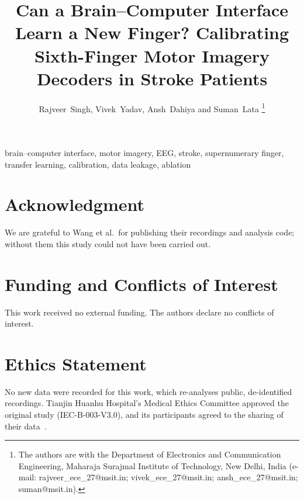 \documentclass[journal,onecolumn,11pt]{IEEEtran}
\begin{document}

\title{Can a Brain--Computer Interface Learn a New Finger? Calibrating Sixth-Finger Motor
Imagery Decoders in Stroke Patients}

\author{Rajveer~Singh, Vivek~Yadav, Ansh~Dahiya and Suman~Lata%
\thanks{The authors are with the Department of Electronics and Communication Engineering,
Maharaja Surajmal Institute of Technology, New Delhi, India (e-mail:
rajveer\_ece\_27@msit.in;
vivek\_ece\_27@msit.in;
ansh\_ece\_27@msit.in;
suman@msit.in).}}


\maketitle

\begin{abstract}

\end{abstract}

\begin{IEEEkeywords}
brain--computer interface, motor imagery, EEG, stroke, supernumerary finger, transfer
learning, calibration, data leakage, ablation
\end{IEEEkeywords}










\section*{Acknowledgment}
We are grateful to Wang et al.\ for publishing their recordings and analysis code; without
them this study could not have been carried out.

\section*{Funding and Conflicts of Interest}
This work received no external funding. The authors declare no conflicts of interest.

\section*{Ethics Statement}
No new data were recorded for this work, which re-analyses public, de-identified
recordings. Tianjin Huanhu Hospital's Medical Ethics Committee approved the original
study (IEC-B-003-V3.0), and its participants agreed to the sharing of their
data~\cite{wang2026dataset}.
\end{document}
